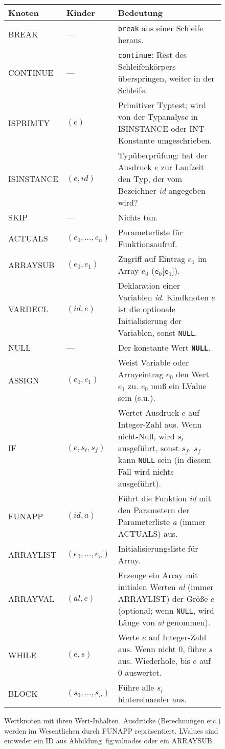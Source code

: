 \documentclass[11pt,a4paper]{article}
\newcommand{\Cpp}[1]{\textcolor{dcyan}{\texttt{#1}}}
\newcommand{\Ckw}[1]{\textbf{\texttt{#1}}}
\begin{document}
\begin{figure}[h]
\begin{tabular}{|p{2.5cm}|p{2cm}|p{12cm}|}
\hline
\textbf{Knoten} & \textbf{Kinder} & \textbf{Bedeutung} \\
\hline
\hline
\textsf{BREAK}		& ---		& \texttt{break} aus einer Schleife heraus. \\
\hline
\textsf{CONTINUE} 	& ---		& \texttt{continue}: Rest des Schleifenkörpers überspringen, weiter in der Schleife. \\
\hline
\textsf{ISPRIMTY}	& $(e)$		& Primitiver Typtest; wird von der Typanalyse in \textsf{ISINSTANCE} oder \textsf{INT}-Konstante umgeschrieben. \\
\hline
\textsf{ISINSTANCE}	& $(e, \textit{id})$ & Typüberprüfung: hat der Ausdruck $e$ zur Laufzeit den Typ, der vom Bezeichner \textit{id} angegeben wird? \\
\hline
\textsf{SKIP} 		& ---		& Nichts tun. \\
\hline
\textsf{ACTUALS}	& $(e_0, \ldots, e_n)$ & Parameterliste für Funktionsaufruf. \\
\hline
\textsf{ARRAYSUB}	& $(e_0, e_1)$	& Zugriff auf Eintrag $e_1$ im Array $e_0$ ($\texttt{e}_0$[$\texttt{e}_1$]). \\
\hline
\textsf{VARDECL}	& $(\textit{id}, e)$ & Deklaration einer Variablen \textit{id}.  Kindknoten $e$ ist die optionale Initialisierung der Variablen, sonst \Cpp{NULL}. \\
\hline
\textsf{NULL}		& ---		& Der konstante Wert \Ckw{NULL}.\\
\hline
\textsf{ASSIGN}		& $(e_0, e_1)$  & Weist Variable oder Arrayeintrag  $e_0$ den Wert $e_1$ zu. $e_0$ muß ein LValue sein (s.u.). \\
\hline
\textsf{IF}		& $(e, s_t, s_f)$ & Wertet Ausdruck $e$ auf Integer-Zahl aus.  Wenn nicht-Null, wird $s_t$ ausgeführt, sonst $s_f$.  $s_f$ kann \Cpp{NULL} sein (in diesem Fall wird nichts ausgeführt). \\
\hline
\textsf{FUNAPP}		& $(\textit{id}, \textit{a})$ & Führt die Funktion \textit{id} mit den Parametern der Parameterliste \textit{a} (immer \textsf{ACTUALS}) aus. \\
\hline
\textsf{ARRAYLIST }	& $(e_0, \ldots, e_n)$ & Initialisierungsliste für Array. \\
\hline
\textsf{ARRAYVAL}	& $(\textit{al}, e)$ & Erzeuge ein Array mit initialen Werten \textit{al} (immer \textsf{ARRAYLIST}) der Größe $e$ (optional; wenn \Cpp{NULL}, wird Länge von \textit{al} genommen). \\
\hline
\textsf{WHILE}		& $(e, s)$	& Werte $e$ auf Integer-Zahl aus.  Wenn nicht $0$, führe $s$ aus.  Wiederhole, bis $e$ auf $0$ auswertet. \\
\hline
\textsf{BLOCK}		& $(s_0, \ldots, s_n)$ & Führe alle $s_i$ hintereinander aus. \\
\hline
\end{tabular}
\caption{Wertknoten mit ihren Wert-Inhalten.  Ausdrücke (Berechnungen etc.) werden im Wesentlichen durch \textsf{FUNAPP} repräsentiert.  LValues sind
entweder ein \textsf{ID} aus Abbildung~{fig:valnodes} oder ein \textsf{ARRAYSUB}.
}\label{fig:rnodes}
\end{figure}
\end{document}
